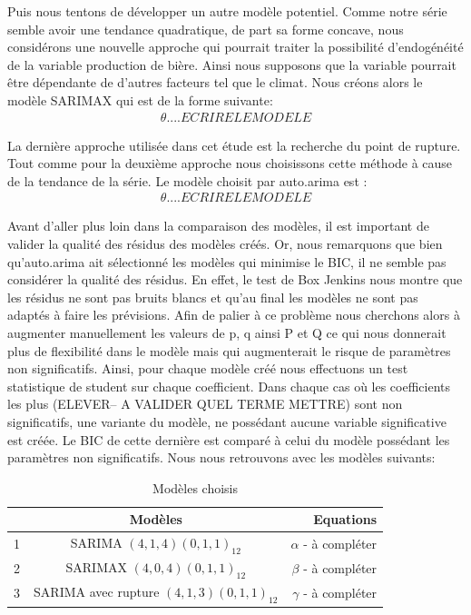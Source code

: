 \documentclass[12pt,a4paper]{book}
\newcommand{\1}{\mathds{1}}
\begin{document}
Puis nous tentons de développer un autre modèle potentiel. Comme notre série semble avoir une tendance quadratique, de part sa forme concave, nous considérons une nouvelle approche qui pourrait traiter la possibilité d'endogénéité de la variable production de bière. Ainsi nous supposons que la variable pourrait être dépendante de d'autres facteurs tel que le climat. Nous créons alors le modèle SARIMAX qui est de la forme suivante:
\begin{align*}
\theta ....ECRIRE LE MODELE
\end{align*}

La dernière approche utilisée dans cet étude est la recherche du point de rupture. Tout comme pour la deuxième approche nous choisissons cette méthode à cause de la tendance de la série. Le modèle choisit par auto.arima est :
\begin{align*}
\theta ....ECRIRE LE MODELE
\end{align*}

Avant d'aller plus loin dans la comparaison des modèles, il est important de valider la qualité des résidus des modèles créés. Or, nous remarquons que bien qu'auto.arima ait sélectionné les modèles qui minimise le BIC, il ne semble pas considérer la qualité des résidus. En effet, le test de Box Jenkins nous montre que les résidus ne sont pas bruits blancs et qu'au final les modèles ne sont pas adaptés à faire les prévisions. Afin de palier à ce problème nous cherchons alors à augmenter manuellement les valeurs de p, q ainsi P et Q ce qui nous donnerait plus de flexibilité dans le modèle mais qui augmenterait le risque de paramètres non significatifs. Ainsi, pour chaque modèle créé nous effectuons un test statistique de student sur chaque coefficient. Dans chaque cas où les coefficients les plus (ELEVER-- A VALIDER QUEL TERME METTRE) sont non significatifs, une variante du modèle, ne possédant aucune variable significative est créée. Le BIC de cette dernière est comparé à celui du modèle possédant les paramètres non significatifs. Nous nous retrouvons avec les modèles suivants:

\begin{table}[h!]
  \begin{center}
    \caption{Modèles choisis}
    \label{tab:table1}
    \begin{tabular}{l|c|r} %
      \ & \textbf{Modèles} & \textbf{Equations}\\
      \hline
      1 & SARIMA $(4,1,4)(0,1,1)_{12}$ & $\alpha$ - à compléter\\
      2 & SARIMAX $(4,0,4)(0,1,1)_{12}$& $\beta$ - à compléter\\
      3 & SARIMA avec rupture $(4,1,3)(0,1,1)_{12}$ & $\gamma$ - à compléter\\
    \end{tabular}
  \end{center}
\end{table}
\end{document}
